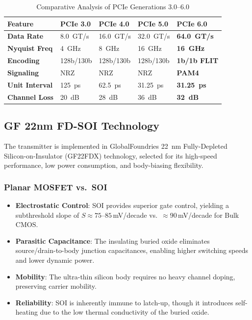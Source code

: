 \begin{table}[htbp]
    \centering
    \caption{Comparative Analysis of PCIe Generations 3.0--6.0}
    \label{tab:pcie_comparison}
    \begin{tabular}{|l|l|l|l|l|}
        \hline
        \textbf{Feature} & \textbf{PCIe 3.0} & \textbf{PCIe 4.0} & \textbf{PCIe 5.0} 
        & \textbf{PCIe 6.0} \\ \hline
        \textbf{Data Rate}     & 8.0~GT/s  & 16.0~GT/s & 32.0~GT/s & \textbf{64.0~GT/s} \\ \hline
        \textbf{Nyquist Freq}  & 4~GHz     & 8~GHz     & 16~GHz    & \textbf{16~GHz}    \\ \hline
        \textbf{Encoding}      & 128b/130b & 128b/130b & 128b/130b & \textbf{1b/1b FLIT}\\ \hline
        \textbf{Signaling}     & NRZ       & NRZ       & NRZ       & \textbf{PAM4}      \\ \hline
        \textbf{Unit Interval} & 125~ps    & 62.5~ps   & 31.25~ps  & \textbf{31.25~ps}  \\ \hline
        \textbf{Channel Loss}  & 20~dB     & 28~dB     & 36~dB     & \textbf{32~dB}     \\ \hline
    \end{tabular}
\end{table}

\subsection*{GF 22nm FD-SOI Technology}

The transmitter is implemented in GlobalFoundries 22~nm Fully-Depleted 
Silicon-on-Insulator (GF22FDX) technology, selected for its high-speed performance, 
low power consumption, and body-biasing flexibility.

\subsubsection*{Planar MOSFET vs.\ SOI}
\begin{itemize}
    \item \textbf{Electrostatic Control}: SOI provides superior gate control, yielding 
    a subthreshold slope of $S \approx 75$--$85\,$mV/decade vs.\ $\approx 90\,$mV/decade 
    for Bulk CMOS.
    \item \textbf{Parasitic Capacitance}: The insulating buried oxide eliminates 
    source/drain-to-body junction capacitances, enabling higher switching speeds and 
    lower dynamic power.
    \item \textbf{Mobility}: The ultra-thin silicon body requires no heavy channel 
    doping, preserving carrier mobility.
    \item \textbf{Reliability}: SOI is inherently immune to latch-up, though it 
    introduces self-heating due to the low thermal conductivity of the buried oxide.
\end{itemize}

